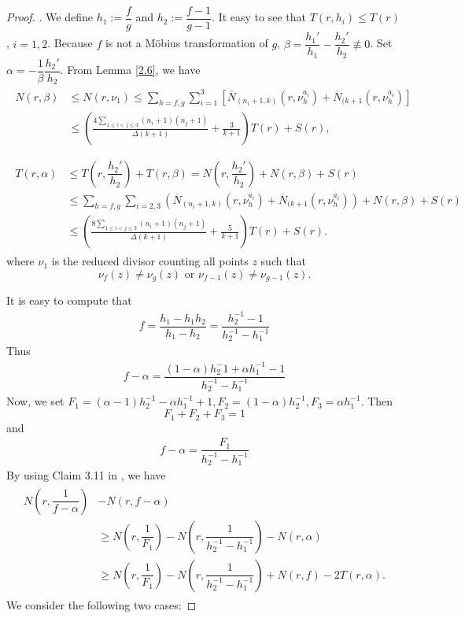 \documentclass[10pt,a4paper]{amsart}
\begin{document}
\begin{proof}. 
We define $h_1:=\dfrac{f}{g}$ and $h_2:=\dfrac{f-1}{g-1}$. It easy to see that $T(r, h_i)\le T(r)$, $i=1,2$. Because $f$ is not a M\"{o}bius transformation of $g$, $\beta =\dfrac{h_1'}{h_1}-\dfrac{h_2'}{h_2} \not\equiv 0$. Set $\alpha=-\dfrac{1}{\beta}\dfrac{h_2'}{h_2}$. From Lemma \ref{2.6}, we have
\begin{align}\label{3.2}
\begin{split}
    N(r, \beta)&\le N(r, \nu_1)\le \sum_{h=f, g} \sum_{i=1}^{3}\left[\overline{N}_{(n_i+1,k)}(r, \nu_h^{a_i})+\overline{N}_{(k+1}(r, \nu_h^{a_i})\right]\\
    &\le \left(\frac{4\sum_{1\le i<j\le 3}(n_i+1)(n_j+1)}{\Delta(k+1)}+\frac{3}{k+1}\right)T(r)+S(r),\\
\end{split} 
\end{align} 
\begin{align}\label{3.3}\begin{split}
    T(r, \alpha)&\le T\left(r, \dfrac{h_2'}{h_2}\right)+T(r, \beta)=N\left(r, \dfrac{h_2'}{h_2}\right)+N(r, \beta)+S(r)\\
    & \le \sum_{h=f, g} \sum_{i=2,3}\left(\overline{N}_{(n_i+1,k)}(r, \nu_h^{a_i}) +\overline{N}_{(k+1}(r, \nu_h^{a_i})\right)+ N(r,\beta) +S(r)\\
    & \le \left(\frac{8\sum_{1\le i<j\le 3}(n_i+1)(n_j+1)}{\Delta(k+1)}+\frac{5}{k+1}\right)T(r) +S(r).
\end{split}\end{align}
where $\nu_1$ is the reduced divisor counting all points $z$ such that 
$$\nu_f(z)\ne \nu_g(z)\text{ or }\nu_{f-1}(z)\ne \nu_{g-1}(z).$$

It is easy to compute that
\begin{align*}
    f = \dfrac{h_1-h_1h_2}{h_1-h_2}=\dfrac{h_2^{-1}-1}{h_2^{-1}-h_1^{-1}}
\end{align*}
Thus 
\begin{align*}
    f-\alpha=\dfrac{(1-\alpha)h_2^-1+\alpha h_1^{-1}-1}{h_2^{-1}-h_1^{-1}}
\end{align*}
Now, we set $F_1=(\alpha-1)h_2^{-1}-\alpha h_1^{-1}+1, F_2=(1-\alpha)h_2^{-1}, F_3=\alpha h_1^{-1}$. Then
$$F_1+F_2+F_3=1$$
and
\begin{align*}
    f-\alpha=\dfrac{F_1}{h_2^{-1}-h_1^{-1}}
\end{align*}
By using Claim 3.11 in \cite{QK}, we have
\begin{align}\label{3.4}
\begin{split}
 N\left(r,\dfrac{1}{f-\alpha}\right)&-N(r,f-\alpha)\\
&\ge N\left(r,\dfrac{1}{F_1}\right)-N\left(r,\dfrac{1}{h_2^{-1}-h_1^{-1}}\right)-N(r,\alpha)\\
&\ge N\left(r,\dfrac{1}{F_1}\right)-N\left(r,\dfrac{1}{h_2^{-1}-h_1^{-1}}\right)+N(r,f)-2T(r,\alpha).
\end{split}
\end{align}
\noindent We consider the following two cases:


\end{proof}
\end{document}
